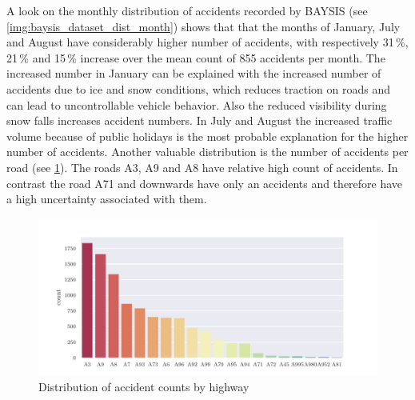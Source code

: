 A look on the monthly distribution of accidents recorded by BAYSIS (see \cref{img:baysis_dataset_dist_month}) shows that that the months of January, July and August have considerably higher number of accidents, with respectively 31\,\%, 21\,\% and 15\,\% increase over the mean count of 855 accidents per month. The increased number in January can be explained with the increased number of accidents due to ice and snow conditions, which reduces traction on roads and can lead to uncontrollable vehicle behavior. Also the reduced visibility during snow falls increases accident numbers. In July and August the increased traffic volume because of public holidays is the most probable explanation for the higher number of accidents. Another valuable distribution is the number of accidents per road (see \cref{img:baysis_dataset_dist_highway}). The roads A3, A9 and A8 have relative high count of accidents. In contrast the road A71 and downwards have only an accidents and therefore have a high uncertainty associated with them. 
\begin{figure}[ht]
	\centering
	\includegraphics[scale=0.75]{CorrAnalysis/data/BAYSIS/01_dataset/plots/baysis_dataset_hist_highway}
	\caption{Distribution of accident counts by highway}
	\label{img:baysis_dataset_dist_highway}
	\vspace{-8mm}
\end{figure}
